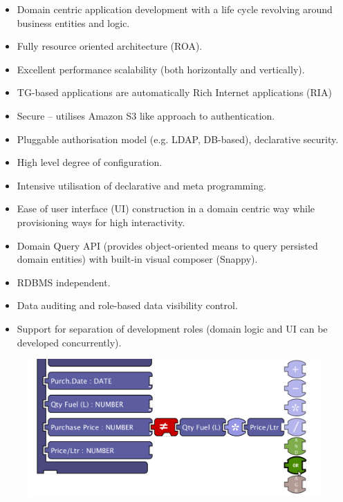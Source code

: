\documentclass[a4paper,10pt,twocolumn]{article}
\begin{document}
  \begin{itemize}
    \item Domain centric application development with a life cycle revolving around business entities and logic.
    \item Fully resource oriented architecture (ROA).
    \item Excellent performance scalability (both horizontally and vertically).
    \item TG-based applications are automatically Rich Internet applications (RIA)
    \item Secure -- utilises Amazon S3 like approach to authentication.
    \item Pluggable authorisation model (e.g. LDAP, DB-based), declarative security.
    \item High level degree of configuration.
    \item Intensive utilisation of declarative and meta programming.    
    \item Ease of user interface (UI) construction in a domain centric way while provisioning ways for high interactivity.
    \item Domain Query API (provides object-oriented means to query persisted domain entities) with built-in visual composer (Snappy).
    \item RDBMS independent.
    \item Data auditing and role-based data visibility control.
    \item Support for separation of development roles (domain logic and UI can be developed concurrently).
  \end{itemize}

  \begin{figure}[!h]
  \centering
  \includegraphics[scale=0.22]{images/01-rulesarea-suggestionmenu.png}  
  \end{figure}
\end{document}
